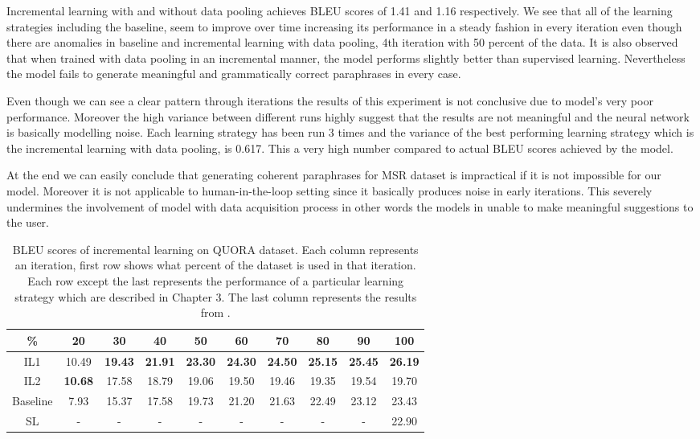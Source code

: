 Incremental learning with and without data pooling achieves BLEU scores of 1.41 and 1.16 respectively. We see that all of the learning strategies including the baseline, seem to improve over time increasing its performance in a steady fashion in every iteration even though there are anomalies in baseline and incremental learning with data pooling, 4th iteration with 50 percent of the data. It is also observed that when trained with data pooling in an incremental manner, the model performs slightly better than supervised learning. Nevertheless the model fails to generate meaningful and grammatically correct paraphrases in every case.

Even though we can see a clear pattern through iterations the results of this experiment is not conclusive due to model's very poor performance. Moreover the high variance between different runs highly suggest that the results are not meaningful and the neural network is basically modelling noise. Each learning strategy has been run 3 times and the variance of the best performing learning strategy which is the incremental learning with data pooling, is 0.617. This a very high number compared to actual BLEU scores achieved by the model. 

At the end we can easily conclude that generating coherent paraphrases for MSR dataset is impractical if it is not impossible for our model. Moreover it is not applicable to human-in-the-loop setting since it basically produces noise in early iterations. This severely undermines the involvement of model with data acquisition process in other words the models in unable to make meaningful suggestions to the user.

\begin{table}[b]
\centering
\large
\begin{adjustbox}{width=1.2\textwidth,center=\textwidth} 
 \begin{tabular}{|c | c | c | c | c | c | c | c | c | c |} 
 \hline
 \% & 20 & 30 & 40 & 50 & 60 & 70 & 80 & 90 & 100 \\ [0.5ex] 
 \hline
  IL1 & 10.49 &  \textbf{19.43} & \textbf{21.91} &  \textbf{23.30} &  \textbf{24.30} &  \textbf{24.50} &  \textbf{25.15} &  \textbf{25.45} &  \textbf{26.19}  \\ 
 \hline
  IL2 &  \textbf{10.68} & 17.58 & 18.79 & 19.06 & 19.50 & 19.46 & 19.35 & 19.54 & 19.70 \\ 
 \hline
 Baseline & 7.93 & 15.37 & 17.58 & 19.73 & 21.20 & 21.63 & 22.49 & 23.12 & 23.43 \\ 
 \hline
 SL & - & - & - & - & - & - & - & - & 22.90  \\ 
 \hline
\end{tabular}
\end{adjustbox}
\caption{BLEU scores of incremental learning on QUORA dataset. Each column represents an iteration, first row shows what percent of the dataset is used in that iteration. Each row except the last represents the performance of a particular learning strategy which are described in Chapter 3. The last column represents the results from \cite{Guptaetal}.}
\label{table:4.2}
\end{table}

